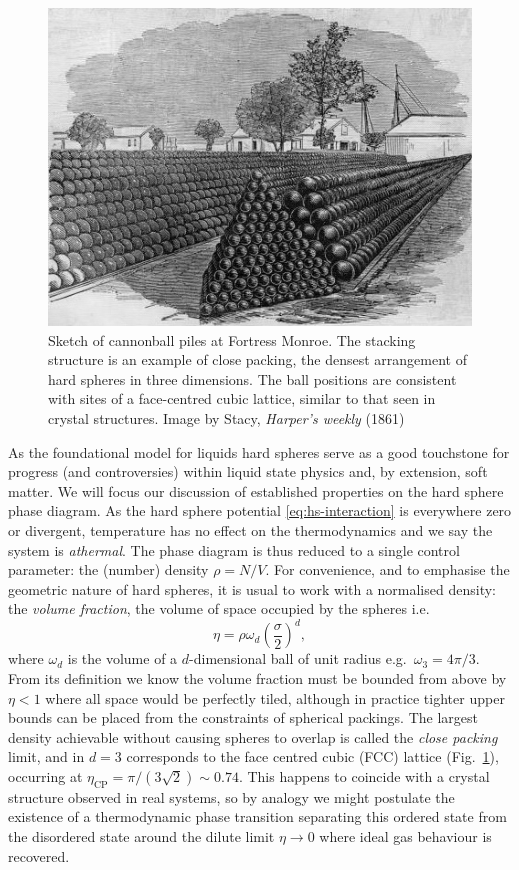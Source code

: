 \documentclass[11pt,twoside]{report}
\begin{document}
\begin{figure}
  \includegraphics[width=0.75\linewidth,outer]{cannonballs}
  \caption[Close packed cannonballs]{
    Sketch of cannonball piles at Fortress Monroe.
    The stacking structure is an example of close packing, the densest arrangement of hard spheres in three dimensions.
    The ball positions are consistent with sites of a face-centred cubic lattice, similar to that seen in crystal structures.
    Image by Stacy, \emph{Harper's weekly} (1861)}
  \label{fig:fcc}
\end{figure}

As the foundational model for liquids hard spheres serve as a good touchstone for progress (and controversies) within liquid state physics and, by extension, soft matter.
We will focus our discussion of established properties on the hard sphere phase diagram.
As the hard sphere potential \eqref{eq:hs-interaction} is everywhere zero or divergent, temperature has no effect%
on the thermodynamics and we say the system is \emph{athermal}.
The phase diagram is thus reduced to a single control parameter: the (number) density $\rho = N/V$.
For convenience, and to emphasise the geometric nature of hard spheres, it is usual to work with a normalised density: the \emph{volume fraction}, the volume of space occupied by the spheres i.e.\
\begin{equation}\label{eq:hs-volume-fraction}
  \eta
  =
  \rho \omega_d \left( \frac{\sigma}{2}\right)^d,
\end{equation}
where $\omega_d$ is the volume of a $d$-dimensional ball of unit radius e.g.\ $\omega_3 = 4\pi / 3$.
From its definition we know the volume fraction must be bounded from above by $\eta < 1$ where all space would be perfectly tiled, although in practice tighter upper bounds can be placed from the constraints of spherical packings.
The largest density achievable without causing spheres to overlap is called the \emph{close packing} limit, and in $d = 3$ corresponds to the face centred cubic (FCC) lattice (Fig.\ \ref{fig:fcc}), occurring at $\eta_\mathrm{CP} = \pi / (3\sqrt{2}) \sim 0.74$.
This happens to coincide with a crystal structure observed in real systems, so by analogy we might postulate the existence of a thermodynamic phase transition separating this ordered state from the disordered state around the dilute limit $\eta \to 0$ where ideal gas behaviour is recovered.
\end{document}

